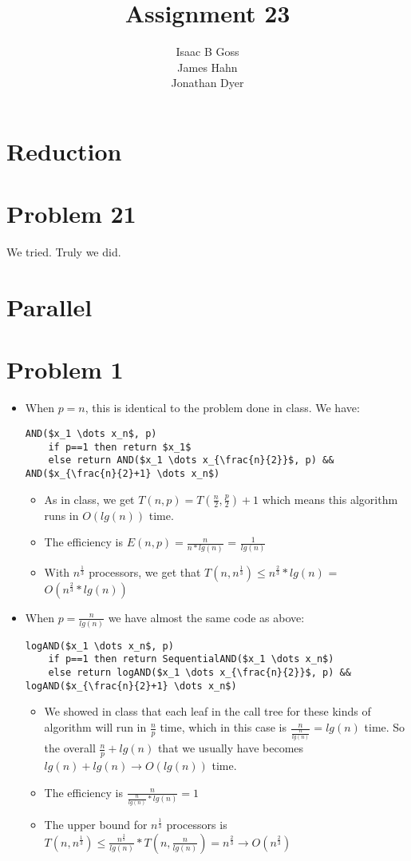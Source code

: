 \documentclass{article}
\author{Isaac B Goss\\ James Hahn\\ Jonathan Dyer}
\title{Assignment 23}
\providecommand{\prob}[1]{\section*{Problem #1}}
\begin{document}
\maketitle

\section*{Reduction}
\prob{21}
We tried. Truly we did.

\bigskip

\section*{Parallel}
\prob{1}
\begin{itemize}
  \item When $p = n$, this is identical to the problem done in class. We have:
  \begin{lstlisting}
AND($x_1 \dots x_n$, p)
    if p==1 then return $x_1$
    else return AND($x_1 \dots x_{\frac{n}{2}}$, p) && AND($x_{\frac{n}{2}+1} \dots x_n$)
  \end{lstlisting}
  \begin{itemize}
    \item As in class, we get $T(n,p) = T(\frac{n}{2},\frac{p}{2}) + 1$ which means this algorithm runs in $O(lg(n))$ time.
    \item The efficiency is $E(n,p) = \frac{n}{n*lg(n)}$ = $\frac{1}{lg(n)}$
    \item With $n^{\frac{1}{3}}$ processors, we get that $T(n,n^{\frac{1}{3}}) \leq n^{\frac{2}{3}}*lg(n)$ = $O(n^{\frac{2}{3}}*lg(n))$
  \end{itemize}

  \item When $p = \frac{n}{lg(n)}$ we have almost the same code as above:
  \begin{lstlisting}
logAND($x_1 \dots x_n$, p)
    if p==1 then return SequentialAND($x_1 \dots x_n$)
    else return logAND($x_1 \dots x_{\frac{n}{2}}$, p) && logAND($x_{\frac{n}{2}+1} \dots x_n$)
  \end{lstlisting}
  \begin{itemize}
    \item We showed in class that each leaf in the call tree for these kinds of algorithm will run in $\frac{n}{p}$ time, which in this case is $\frac{n}{\frac{n}{lg(n)}} = lg(n)$ time. So the overall $\frac{n}{p} + lg(n)$ that we usually have becomes $lg(n) + lg(n) \rightarrow O(lg(n))$ time.
    \item The efficiency is $\frac{n}{\frac{n}{lg(n)}*lg(n)} = 1$
    \item The upper bound for $n^{\frac{1}{3}}$ processors is $T(n,n^{\frac{1}{3}}) \leq \frac{n^{\frac{2}{3}}}{lg(n)}*T(n,\frac{n}{lg(n)}) = n^{\frac{2}{3}} \rightarrow O(n^{\frac{2}{3}})$
  \end{itemize}


\end{itemize}
\end{document}
